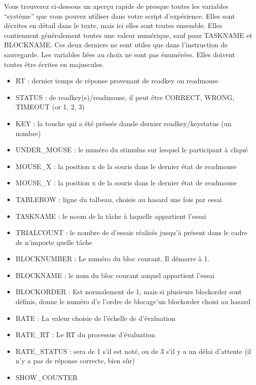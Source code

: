 \documentclass[
]{book}
\providecommand{\tightlist}{%
  \setlength{\itemsep}{0pt}\setlength{\parskip}{0pt}}
\begin{document}
Vous trouverez ci-dessous un aperçu rapide de presque toutes les variables ``système'' que vous pouvez utiliser dans votre script d'expérience. Elles sont décrites en détail dans le texte, mais ici elles sont toutes ensemble. Elles contiennent généralement toutes une valeur numérique, sauf pour TASKNAME et BLOCKNAME. Ces deux derniers ne sont utiles que dans l'instruction de sauvegarde. Les variables liées au choix ne sont pas énumérées. Elles doivent toutes être écrites en majuscules.

\begin{itemize}
\tightlist
\item
  RT : dernier temps de réponse provenant de readkey ou readmouse
\item
  STATUS : de readkey(s)/readmouse, il peut être CORRECT, WRONG, TIMEOUT (or 1, 2, 3)
\item
  KEY : la touche qui a été préssée dansle dernier readkey/keystatus (un nombre)
\item
  UNDER\_MOUSE : le numéro du stimulus sur lesquel le participant à cliqué
\item
  MOUSE\_X : la position x de la souris dans le dernier état de readmouse
\item
  MOUSE\_Y : la position x de la souris dans le dernier état de readmouse
\item
  TABLEROW : ligne du talbeau, choisie au hasard une fois par essai
\item
  TASKNAME : le noom de la tâche à laquelle appartient l'essai
\item
  TRIALCOUNT : le nombre de d'essais réalisés jusqu'à présent dans le cadre de n'importe quelle tâche
\item
  BLOCKNUMBER : Le numéro du bloc courant. Il démarre à 1.
\item
  BLOCKNAME : le nom du bloc courant auquel appartient l'essai
\item
  BLOCKORDER : Est normalement de 1, mais si plusieurs blockorder sont définis, donne le numéro d'e l'ordre de blocage'un blockorder choisi au hasard
\item
  RATE : La valeur choisie de l'échelle de d'évaluation
\item
  RATE\_RT : Le RT du processus d'évaluation
\item
  RATE\_STATUS : sera de 1 s'il est noté, ou de 3 s'il y a un délai d'attente (il n'y a pas de réponse correcte, bien sûr)
\item
  SHOW\_COUNTER
\end{itemize}
\end{document}

